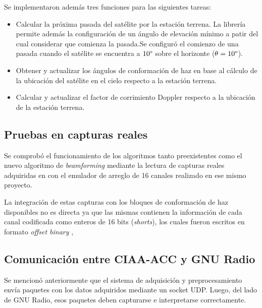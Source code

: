\documentclass[../../main.tex]{subfiles}
\begin{document}
Se implementaron además tres funciones para las siguientes tareas:
\begin{itemize}
    \item Calcular la próxima pasada del satélite por la estación terrena. La librería permite además la configuración de un ángulo de elevación mínimo a patir del cual considerar que comienza la pasada.Se configuró el comienzo de una pasada cuando el satélite se encuentra a $10\degree$ sobre el horizonte ($\theta = 10\degree$).
    \item Obtener y actualizar los ángulos de conformación de haz en base al cálculo de la ubicación del satélite en el cielo respecto a la estación terrena.
    \item Calcular  y actualizar el factor de corrimiento Doppler respecto a la ubicación de la estación terrena.
\end{itemize}




\subsection{Pruebas en capturas reales}
Se comprobó el funcionamiento de los algoritmos tanto preexistentes como el nuevo algoritmo de \textit{beamforming} mediante la lectura de capturas reales adquiridas en \cite{proyecto-jose} con el emulador de arreglo de 16 canales realizado en ese mismo proyecto.

La integración de estas capturas con los bloques de conformación de haz disponibles no es directa ya que las mismas contienen la información de cada canal codificada como enteros de 16 bits (\textit{shorts}), los cuales fueron escritos en formato \textit{offset binary} , 







\subsection{Comunicación entre CIAA-ACC y GNU Radio}\label{subsec::comuicacion-con-gnuradio}
Se mencionó anteriormente que el sistema de adquisición y preprocesamiento envía paquetes con los datos adquiridos mediante un socket UDP. Luego, del lado de GNU Radio, esos paquetes deben capturarse e interpretarse correctamente. 
\end{document}
